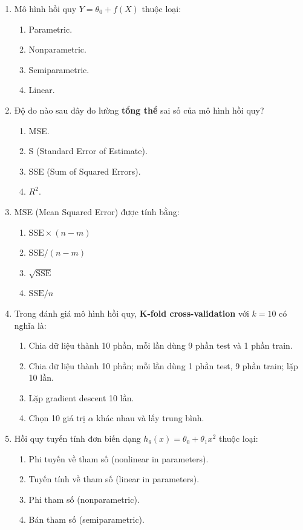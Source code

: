 \documentclass[10pt]{article}
\begin{document}
\begin{enumerate}[leftmargin=*, label=\textbf{Câu \arabic*.}]
    \item Mô hình hồi quy $Y = \theta_0 + f(X)$ thuộc loại:
    \begin{enumerate}[label=\Alph*.]
        \item Parametric.
        \item Nonparametric.
        \item Semiparametric.
        \item Linear.
    \end{enumerate}

    \item Độ đo nào sau đây đo lường \textbf{tổng thể} sai số của mô hình hồi quy?
    \begin{enumerate}[label=\Alph*.]
        \item MSE.
        \item S (Standard Error of Estimate).
        \item SSE (Sum of Squared Errors).
        \item $R^2$.
    \end{enumerate}

    \item MSE (Mean Squared Error) được tính bằng:
    \begin{enumerate}[label=\Alph*.]
        \item $\text{SSE} \times (n - m)$
        \item $\text{SSE} / (n - m)$
        \item $\sqrt{\text{SSE}}$
        \item $\text{SSE} / n$
    \end{enumerate}

    \item Trong đánh giá mô hình hồi quy, \textbf{K-fold cross-validation} với $k=10$ có nghĩa là:
    \begin{enumerate}[label=\Alph*.]
        \item Chia dữ liệu thành 10 phần, mỗi lần dùng 9 phần test và 1 phần train.
        \item Chia dữ liệu thành 10 phần; mỗi lần dùng 1 phần test, 9 phần train; lặp 10 lần.
        \item Lặp gradient descent 10 lần.
        \item Chọn 10 giá trị $\alpha$ khác nhau và lấy trung bình.
    \end{enumerate}

    \item Hồi quy tuyến tính đơn biến dạng $h_\theta(x) = \theta_0 + \theta_1 x^2$ thuộc loại:
    \begin{enumerate}[label=\Alph*.]
        \item Phi tuyến về tham số (nonlinear in parameters).
        \item Tuyến tính về tham số (linear in parameters).
        \item Phi tham số (nonparametric).
        \item Bán tham số (semiparametric).
    \end{enumerate}


\end{enumerate}
\end{document}
